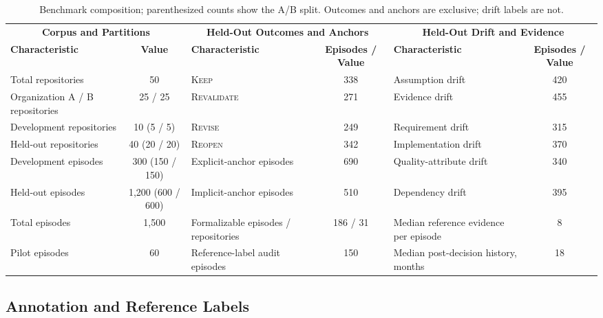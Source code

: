 \documentclass[10pt,conference]{IEEEtran}
\begin{document}
\begin{table}[!t]
\caption{Benchmark composition; parenthesized counts show the A/B split. Outcomes and anchors are exclusive; drift labels are not.}
\label{tab:benchmark-summary}
\centering
\scriptsize
\renewcommand{\arraystretch}{1.04}
\setlength{\tabcolsep}{4pt}
\begin{tabular*}{\textwidth}{@{\extracolsep{\fill}}lclclc@{}}
\toprule
\multicolumn{2}{c}{\textbf{Corpus and Partitions}} &
\multicolumn{2}{c}{\textbf{Held-Out Outcomes and Anchors}} &
\multicolumn{2}{c}{\textbf{Held-Out Drift and Evidence}} \\
\cmidrule(lr){1-2}
\cmidrule(lr){3-4}
\cmidrule(lr){5-6}
\textbf{Characteristic} &
\textbf{Value} &
\textbf{Characteristic} &
\textbf{Episodes / Value} &
\textbf{Characteristic} &
\textbf{Episodes / Value} \\
\midrule
Total repositories
& 50
& \textsc{Keep}
& 338
& Assumption drift
& 420 \\

Organization A / B repositories
& 25 / 25
& \textsc{Revalidate}
& 271
& Evidence drift
& 455 \\

Development repositories
& 10 (5 / 5)
& \textsc{Revise}
& 249
& Requirement drift
& 315 \\

Held-out repositories
& 40 (20 / 20)
& \textsc{Reopen}
& 342
& Implementation drift
& 370 \\

Development episodes
& 300 (150 / 150)
& Explicit-anchor episodes
& 690
& Quality-attribute drift
& 340 \\

Held-out episodes
& 1,200 (600 / 600)
& Implicit-anchor episodes
& 510
& Dependency drift
& 395 \\

Total episodes
& 1,500
& Formalizable episodes / repositories
& 186 / 31
& Median reference evidence per episode
& 8 \\

Pilot episodes
& 60
& Reference-label audit episodes
& 150
& Median post-decision history, months
& 18 \\
\bottomrule
\end{tabular*}
\end{table}



\subsection{Annotation and Reference Labels}
\label{sec:annotation}
\end{document}
